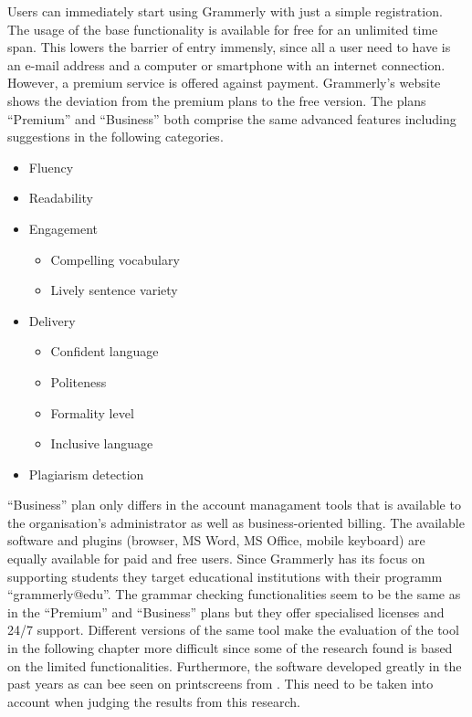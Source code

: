 \documentclass[runningheads]{llncs}
\begin{document}
Users can immediately start using Grammerly with just a simple registration. The usage of the base functionality is available for free for an unlimited time span. This lowers the barrier of entry immensly, since all a user need to have is an e-mail address and a computer or smartphone with an internet connection. However, a premium service is offered against payment. Grammerly's website \citep{noauthor_write_nodate} shows the deviation from the premium plans to the free version. The plans ``Premium'' and ``Business'' both comprise the same advanced features including suggestions in the following categories.
\begin{itemize}
 \item Fluency
 \item Readability
 \item Engagement
 \begin{itemize}
  \item Compelling vocabulary
  \item Lively sentence variety
 \end{itemize}
 \item Delivery
 \begin{itemize}
  \item Confident language
  \item Politeness
  \item Formality level
  \item Inclusive language
 \end{itemize}
 \item Plagiarism detection
\end{itemize}
``Business'' plan only differs in the account managament tools that is available to the organisation's administrator as well as business-oriented billing. The available software and plugins (browser, MS Word, MS Office, mobile keyboard) are equally available for paid and free users. Since Grammerly has its focus on supporting students they target educational institutions with their programm ``grammerly@edu''. The grammar checking functionalities seem to be the same as in the ``Premium'' and ``Business'' plans but they offer specialised licenses and 24/7 support. Different versions of the same tool make the evaluation of the tool in the following chapter more difficult since some of the research found is based on the limited functionalities. Furthermore, the software developed greatly in the past years as can bee seen on printscreens from \textcite{dembsey_closing_2017}. This need to be taken into account when judging the results from this research.
\end{document}
